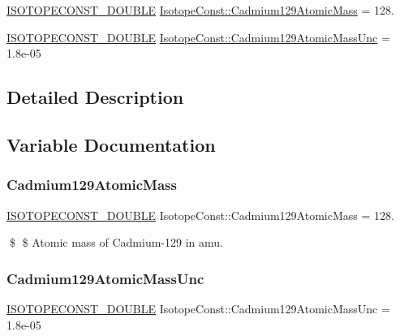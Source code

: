 \begin{DoxyCompactItemize}
\item 
\mbox{\hyperlink{group___isotope_const-_macros_ga8f45a7272ce02c0b4c65c44636ed719a}{I\+S\+O\+T\+O\+P\+E\+C\+O\+N\+S\+T\+\_\+\+D\+O\+U\+B\+LE}} \mbox{\hyperlink{group___isotope_const-_cadmium-_cd129_ga78ee45a239556ee3b31226d611d8f481}{Isotope\+Const\+::\+Cadmium129\+Atomic\+Mass}} = 128.
\item 
\mbox{\hyperlink{group___isotope_const-_macros_ga8f45a7272ce02c0b4c65c44636ed719a}{I\+S\+O\+T\+O\+P\+E\+C\+O\+N\+S\+T\+\_\+\+D\+O\+U\+B\+LE}} \mbox{\hyperlink{group___isotope_const-_cadmium-_cd129_gaa55c483c5a2c8997b5a06c00fd6dc2cf}{Isotope\+Const\+::\+Cadmium129\+Atomic\+Mass\+Unc}} = 1.\+8e-\/05
\end{DoxyCompactItemize}


\subsection{Detailed Description}


\subsection{Variable Documentation}
\mbox{\label{group___isotope_const-_cadmium-_cd129_ga78ee45a239556ee3b31226d611d8f481}} 
\subsubsection{\texorpdfstring{Cadmium129\+Atomic\+Mass}{Cadmium129AtomicMass}}
{\footnotesize\ttfamily \mbox{\hyperlink{group___isotope_const-_macros_ga8f45a7272ce02c0b4c65c44636ed719a}{I\+S\+O\+T\+O\+P\+E\+C\+O\+N\+S\+T\+\_\+\+D\+O\+U\+B\+LE}} Isotope\+Const\+::\+Cadmium129\+Atomic\+Mass = 128.}

\$ \$ Atomic mass of Cadmium-\/129 in amu. \mbox{\label{group___isotope_const-_cadmium-_cd129_gaa55c483c5a2c8997b5a06c00fd6dc2cf}} 
\subsubsection{\texorpdfstring{Cadmium129\+Atomic\+Mass\+Unc}{Cadmium129AtomicMassUnc}}
{\footnotesize\ttfamily \mbox{\hyperlink{group___isotope_const-_macros_ga8f45a7272ce02c0b4c65c44636ed719a}{I\+S\+O\+T\+O\+P\+E\+C\+O\+N\+S\+T\+\_\+\+D\+O\+U\+B\+LE}} Isotope\+Const\+::\+Cadmium129\+Atomic\+Mass\+Unc = 1.\+8e-\/05}

